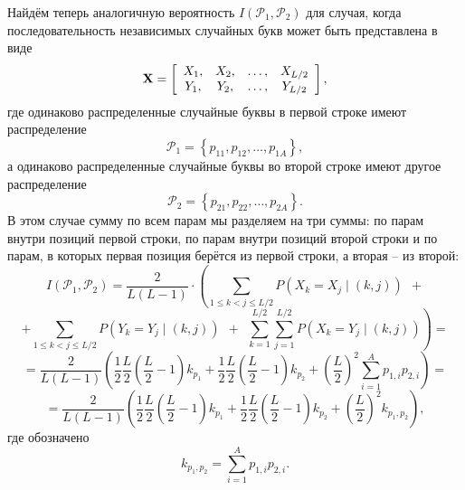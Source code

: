 Найдём теперь аналогичную вероятность $I\left( {\mathcal{P}_1 ,\mathcal{P}_2 } \right)$  для случая, когда последовательность независимых случайных букв может быть представлена в виде
\[
\mathbf{X} = \left[ {\begin{array}{*{20}c}
   {X_1 ,}  \\
   {Y_1 ,}  \\
 \end{array} \begin{array}{*{20}c}
   {X_2 ,}  \\
   {Y_2 ,}  \\
 \end{array} \begin{array}{*{20}c}
   { \ldots ,}  \\
   { \ldots ,}  \\
 \end{array} \begin{array}{*{20}c}
   {X_{L/2} }  \\
   {Y_{L/2} }  \\
 \end{array} } \right],
\]
где одинаково распределенные случайные буквы в первой строке имеют распределение
    \[ \mathcal{P}_1  = \left\{ {p_{11} ,p_{12} ,  \ldots , p_{1A} } \right\}, \]
а одинаково распределенные случайные буквы во второй строке имеют другое распределение
    \[ \mathcal{P}_2  = \left\{ {p_{21} ,p_{22} ,  \ldots , p_{2A} } \right\}. \]
В этом случае сумму по всем парам мы разделяем на три суммы: по парам внутри позиций первой строки, по парам внутри позиций второй строки и по парам, в которых первая позиция берётся из первой строки, а вторая -- из второй:
{ \small
\[
    I(\mathcal{P}_1, \mathcal{P}_2) =
        \frac{2}{L(L - 1)} \cdot \left(
        \sum \limits_{1 \leq k < j \leq L/2} P( X_k  = X_j \mid ( k,j )) ~~ + \right.
\] \[
        \left. + \sum\limits_{1 \leq k < j \leq L/2} P(Y_k  = Y_j \mid (k,j)) ~~+~~
            \sum\limits_{k=1}^{L/2} \sum\limits_{j=1}^{L/2} {P(X_k = Y_j \mid (k,j))} \right) =
\] \[
    = \frac{2}{L(L - 1)} \left( \frac{1}{2} \frac{L}{2} \left( \frac{L}{2} - 1 \right) k_{p_1} +
        \frac{1}{2} \frac{L}{2} \left( \frac{L}{2} - 1 \right) k_{p_2} +
        \left( \frac{L}{2} \right)^2 \sum \limits_{i = 1}^A p_{1,i} p_{2,i} \right) =
\] \[
    = \frac{2}{L(L - 1)} \left( \frac{1}{2} \frac{L}{2} \left( \frac{L}{2} - 1 \right) k_{p_1} +
        \frac{1}{2} \frac{L}{2} \left( \frac{L}{2} - 1 \right) k_{p_2} +
        \left( \frac{L}{2} \right)^2 k_{p_1, p_2} \right),
\] }
где обозначено
    \[ k_{p_1, p_2}  = \sum\limits_{i=1}^A p_{1,i} p_{2,i}. \]


